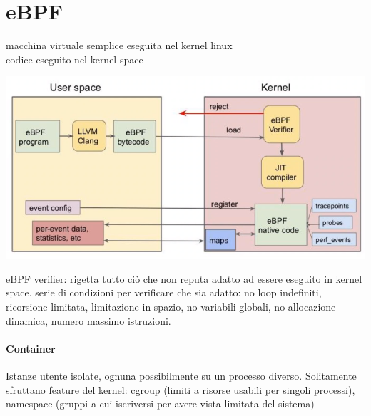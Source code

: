 \documentclass[10pt]{book}
\begin{document}
\section{eBPF}
macchina virtuale semplice eseguita nel kernel linux\\
codice eseguito nel kernel space
\begin{center}
	\includegraphics[scale=0.75]{ebf.png}
\end{center}
eBPF verifier: rigetta tutto ciò che non reputa adatto ad essere eseguito in kernel space. serie di condizioni per verificare che sia adatto: no loop indefiniti, ricorsione limitata, limitazione in spazio, no variabili globali, no allocazione dinamica, numero massimo istruzioni.
\paragraph{Container} Istanze utente isolate, ognuna possibilmente su un processo diverso. Solitamente sfruttano feature del kernel: cgroup (limiti a risorse usabili per singoli processi), namespace (gruppi a cui iscriversi per avere vista limitata del sistema)
\end{document}
